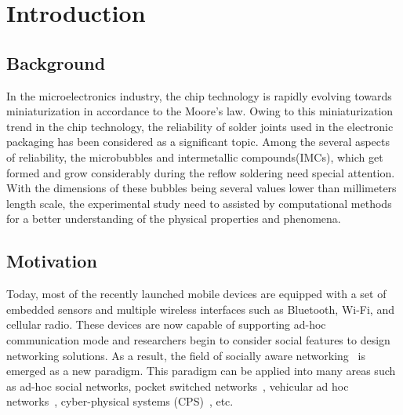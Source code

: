\chapter{Introduction}\label{Chap1}

\section{Background}\label{Chap1_01}
In the microelectronics industry, the chip technology is rapidly evolving towards miniaturization in accordance to the Moore's law. Owing to this miniaturization trend in the chip technology, the reliability of solder joints used in the electronic packaging has been considered as a significant topic.  Among the several aspects of reliability, the microbubbles and intermetallic compounds(IMCs), which get formed and grow considerably during the reflow soldering need special attention. With the dimensions of these bubbles being several values lower than millimeters length scale, the experimental study need to assisted by computational methods for a better understanding of the physical properties and phenomena.

\section{Motivation}\label{Chap1_01}

Today, most of the recently launched mobile devices are equipped with a set of embedded sensors and multiple wireless interfaces such as Bluetooth, Wi-Fi, and cellular radio. These devices are now capable of supporting ad-hoc communication mode and researchers begin to consider social features to design networking solutions. As a result, the field of socially aware networking~\cite{FXia2013} is emerged as a new paradigm. This paradigm can be applied into many areas such as ad-hoc social networks, pocket switched networks~\cite{SWang2012}, vehicular ad hoc networks~\cite{WChen2008}, cyber-physical systems (CPS)~\cite{FJWu2011}, etc.

